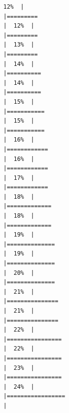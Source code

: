 \documentclass[
  english,
  man,a4paper,mask,floatsintext]{apa6}
\begin{document}
\begin{verbatim}
12%  |                                                                              |=========                                                             |  12%  |                                                                              |=========                                                             |  13%  |                                                                              |=========                                                             |  14%  |                                                                              |==========                                                            |  14%  |                                                                              |==========                                                            |  15%  |                                                                              |===========                                                           |  15%  |                                                                              |===========                                                           |  16%  |                                                                              |============                                                          |  16%  |                                                                              |============                                                          |  17%  |                                                                              |============                                                          |  18%  |                                                                              |=============                                                         |  18%  |                                                                              |=============                                                         |  19%  |                                                                              |==============                                                        |  19%  |                                                                              |==============                                                        |  20%  |                                                                              |==============                                                        |  21%  |                                                                              |===============                                                       |  21%  |                                                                              |===============                                                       |  22%  |                                                                              |================                                                      |  22%  |                                                                              |================                                                      |  23%  |                                                                              |================                                                      |  24%  |                                                                              |=================                                                     |  
\end{verbatim}
\end{document}
